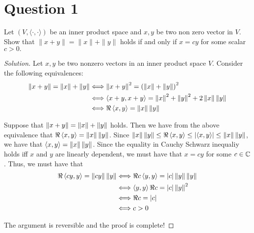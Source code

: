 \section{Question 1 \texorpdfstring{\checkmark}{}}
\horz
Let $(V,\langle \cdot, \cdot \rangle)$ be an inner product space and $x,y$ be two non zero vector in $V.$ 
Show that $\|x+y\| = \|x\|+\|y\|$ holds if and only if $x=cy$ for some scalar $c >0.$
\horz

\begin{proof}[Solution]
    Let $x,y$ be two nonzero vectors in an inner product space $V$. Consider the following equivalences:
    \begin{align*}
	\norm{x+y} = \norm{x} + \norm{y} &\Longleftrightarrow  \norm{x+y}^{2} = \left( \norm{x} + \norm{y} \right)^{2} \\
	&\Longleftrightarrow \ip{x+y, x+y} = \norm{x}^{2} + \norm{y}^2 + 2 \norm{x} \norm{y} \\
	&\Longleftrightarrow \Re \ip{x,y} = \norm{x} \norm{y}
    \end{align*}

    Suppose that $\norm{x+y} = \norm{x} + \norm{y}$ holds. Then we have from the above equivalence that $\Re \ip{x,y} = \norm{x} \norm{y}$. Since $\norm{x}\norm{y} \le \Re \ip{x,y} \le \abs{\ip{x,y}} \le \norm{x}\norm{y}$, we have that $\ip{x,y}  = \norm{x}\norm{y}$. Since the equality in Cauchy Schwarz inequaliy holds iff $x$ and $y$ are linearly dependent, we must have that $x=cy$ for some $c\in \C$. Thus, we must have that
    \begin{align*}
	\Re \ip{cy, y} = \norm{cy}\norm{y} &\Longleftrightarrow \Re{c \ip{y,y}} = \abs{c} \norm{y}\norm{y} \\
	&\Longleftrightarrow \ip{y,y} \Re c = \abs{c} \norm{y}^{2} \\
	&\Longleftrightarrow \Re{c} = \abs{c} \\
	&\Longleftrightarrow c>0
    \end{align*}

    The argument is reversible and the proof is complete!
\end{proof}
